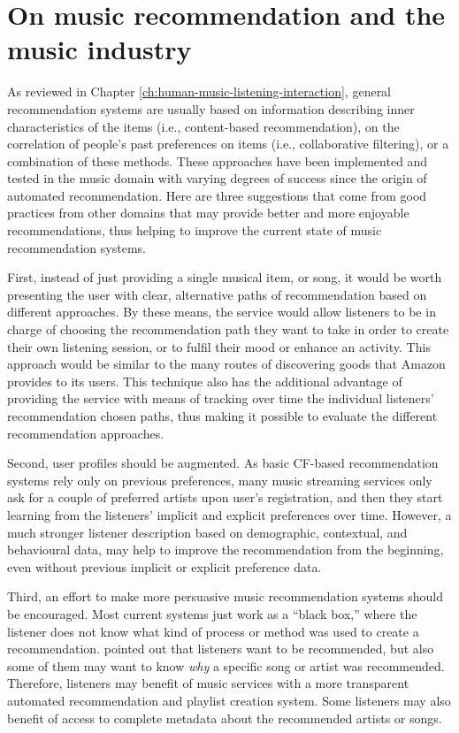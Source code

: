 \section{On music recommendation and the music industry}\label{sec:conc_recommendation}
As reviewed in Chapter \ref{ch:human-music-listening-interaction}, general recommendation systems are usually based on information describing inner characteristics of the items (i.e., content-based recommendation), on the correlation of people's past preferences on items (i.e., collaborative filtering), or a combination of these methods. These approaches have been implemented and tested in the music domain with varying degrees of success since the origin of automated recommendation.
Here are three suggestions that come from good practices from other domains that may provide better and more enjoyable recommendations, thus helping to improve the current state of music recommendation systems.

First, instead of just providing a single musical item, or song, it would be worth presenting the user with clear, alternative paths of recommendation based on different approaches. By these means, the service would allow listeners to be in charge of choosing the recommendation path they want to take in order to create their own listening session, or to fulfil their mood or enhance an activity. 
This approach would be similar to the many routes of discovering goods that Amazon provides to its users. This technique also has the additional advantage of providing the service with means of tracking over time the individual listeners' recommendation chosen paths, thus making it possible to evaluate the different recommendation approaches. 

Second, user profiles should be augmented. As basic CF-based recommendation systems rely only on previous preferences, many music streaming services only ask for a couple of preferred artists upon user's registration, and then they start learning from the listeners' implicit and explicit preferences over time. However, a much stronger listener description based on demographic, contextual, and behavioural data, may help to improve the recommendation from the beginning, even without previous implicit or explicit preference data.

Third, an effort to make more persuasive music recommendation systems should be encouraged. Most current systems just work as a ``black box,'' where the listener does not know what kind of process or method was used to create a recommendation. \textcite{ross08recommendations} pointed out that listeners want to be recommended, but also some of them may want to know \textit{why} a specific song or artist was recommended. 
Therefore, listeners may benefit of music services with a more transparent automated recommendation and playlist creation system. Some listeners may also benefit of access to complete metadata about the recommended artists or songs. 

